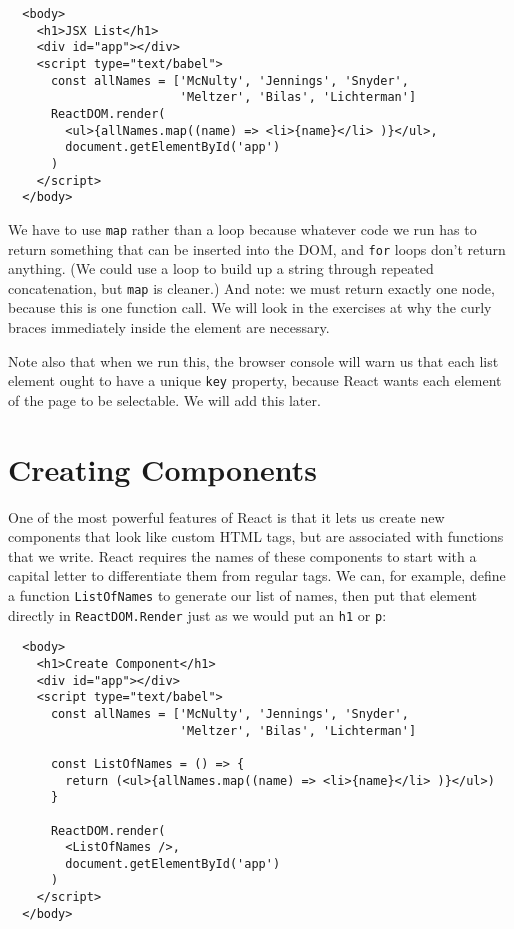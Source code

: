 \begin{verbatim}
  <body>
    <h1>JSX List</h1>
    <div id="app"></div>
    <script type="text/babel">
      const allNames = ['McNulty', 'Jennings', 'Snyder',
                        'Meltzer', 'Bilas', 'Lichterman']
      ReactDOM.render(
        <ul>{allNames.map((name) => <li>{name}</li> )}</ul>,
        document.getElementById('app')
      )
    </script>
  </body>
\end{verbatim}

We have to use \texttt{map} rather than a loop because whatever code we run has to return something
that can be inserted into the DOM,
and \texttt{for} loops don't return anything.
(We could use a loop to build up a string through repeated concatenation,
but \texttt{map} is cleaner.)
And note: we must return exactly one node,
because this is one function call.
We will look in the exercises at why the curly braces immediately inside the \texttt{} element are necessary.

Note also that when we run this,
the browser console will warn us that each list element ought to have a unique \texttt{key} property,
because React wants each element of the page to be selectable.
We will add this later.

\section{Creating Components}\label{s:dynamic-components}

One of the most powerful features of React is that it lets us create new components
that look like custom HTML tags,
but are associated with functions that we write.
React requires the names of these components to start with a capital letter
to differentiate them from regular tags.
We can,
for example,
define a function \texttt{ListOfNames} to generate our list of names,
then put that element directly in \texttt{ReactDOM.Render}
just as we would put an \texttt{h1} or \texttt{p}:

\begin{verbatim}
  <body>
    <h1>Create Component</h1>
    <div id="app"></div>
    <script type="text/babel">
      const allNames = ['McNulty', 'Jennings', 'Snyder',
                        'Meltzer', 'Bilas', 'Lichterman']

      const ListOfNames = () => {
        return (<ul>{allNames.map((name) => <li>{name}</li> )}</ul>)
      }

      ReactDOM.render(
        <ListOfNames />,
        document.getElementById('app')
      )
    </script>
  </body>
\end{verbatim}

